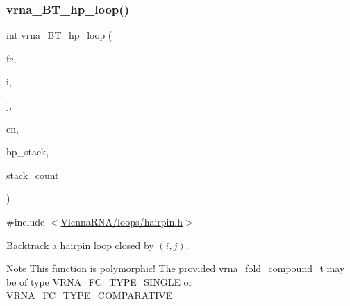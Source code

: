 \subsubsection{\texorpdfstring{vrna\_BT\_hp\_loop()}{vrna\_BT\_hp\_loop()}}
{\footnotesize\ttfamily int vrna\+\_\+\+B\+T\+\_\+hp\+\_\+loop (\begin{DoxyParamCaption}\item[{\mbox{\hyperlink{group__fold__compound_ga1b0cef17fd40466cef5968eaeeff6166}{vrna\+\_\+fold\+\_\+compound\+\_\+t}} $\ast$}]{fc,  }\item[{int}]{i,  }\item[{int}]{j,  }\item[{int}]{en,  }\item[{\mbox{\hyperlink{group__data__structures_gaa651bda42e7692f08cb603cd6834b0ee}{vrna\+\_\+bp\+\_\+stack\+\_\+t}} $\ast$}]{bp\+\_\+stack,  }\item[{int $\ast$}]{stack\+\_\+count }\end{DoxyParamCaption})}



{\ttfamily \#include $<$\mbox{\hyperlink{hairpin_8h}{Vienna\+R\+N\+A/loops/hairpin.\+h}}$>$}



Backtrack a hairpin loop closed by $ (i,j) $. 

\begin{DoxyNote}{Note}
This function is polymorphic! The provided \mbox{\hyperlink{group__fold__compound_ga1b0cef17fd40466cef5968eaeeff6166}{vrna\+\_\+fold\+\_\+compound\+\_\+t}} may be of type \mbox{\hyperlink{group__fold__compound_gga01a4ff86fa71deaaa5d1abbd95a1447da7e264dd3cf2dc9b6448caabcb7763cd6}{V\+R\+N\+A\+\_\+\+F\+C\+\_\+\+T\+Y\+P\+E\+\_\+\+S\+I\+N\+G\+LE}} or \mbox{\hyperlink{group__fold__compound_gga01a4ff86fa71deaaa5d1abbd95a1447dab821ce46ea3cf665be97df22a76f5023}{V\+R\+N\+A\+\_\+\+F\+C\+\_\+\+T\+Y\+P\+E\+\_\+\+C\+O\+M\+P\+A\+R\+A\+T\+I\+VE}} 
\end{DoxyNote}
\mbox{\label{group__mfe__backtracking_ga28015cfbd0afc759b94ff58cc241cb13}} 
